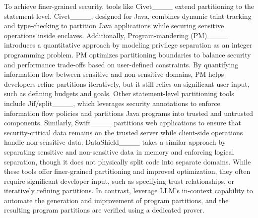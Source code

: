 To achieve finer-grained security, tools like Civet____ extend partitioning to the statement level.
Civet____, designed for Java, combines dynamic taint tracking and type-checking to partition Java applications while securing sensitive operations inside enclaves. Additionally, Program-mandering (PM)____ introduces a quantitative approach by modeling privilege separation as an integer programming problem. 
PM optimizes partitioning boundaries to balance security and performance trade-offs based on user-defined constraints. By quantifying information flow between sensitive and non-sensitive domains, PM helps developers refine partitions iteratively, but it still relies on significant user input, such as defining budgets and goals.
Other statement-level partitioning tools include Jif/split____, which leverages security annotations to enforce information flow policies and partitions Java programs into trusted and untrusted components. 
Similarly, Swift____ partitions web applications to ensure that security-critical data remains on the trusted server while client-side operations handle non-sensitive data. DataShield____ takes a similar approach by separating sensitive and non-sensitive data in memory and enforcing logical separation, though it does not physically split code into separate domains.
While these tools offer finer-grained partitioning and improved optimization, they often require significant developer input, such as specifying trust relationships, or iteratively refining partitions.
In contrast, \tool leverage LLM's in-context capability to automate the generation and improvement of program partitions, and the resulting program partitions are verified using a dedicated prover.

